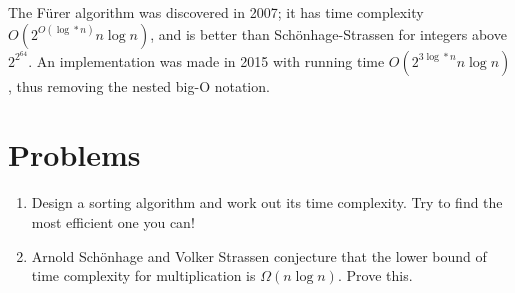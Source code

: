 \documentclass{article}
\begin{document}
The F\"urer algorithm was discovered in 2007; it has time complexity \(O(2^{O(\log*n)}n\log{}n)\), and is better than Schönhage-Strassen for integers above \(2^{2^{64}}\). An implementation was made in 2015 with running time \(O(2^{3\log*n}n\log{}n)\), thus removing the nested big-O notation.

\section{Problems}

\begin{enumerate}
	\item Design a sorting algorithm and work out its time complexity. Try to find the most efficient one you can!
	\item Arnold Sch\"onhage and Volker Strassen conjecture that the lower bound of time complexity for multiplication is \(\Omega(n\log{}n)\). Prove this.
\end{enumerate}
\end{document}
